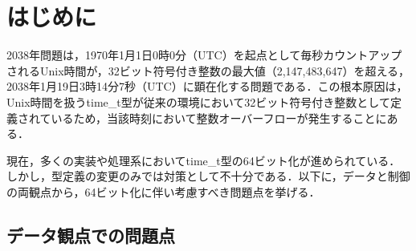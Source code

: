 \documentclass[submit,techrep,noauthor]{ipsj-lualatex}
\begin{document}


\maketitle

\section{はじめに}

2038年問題は，1970年1月1日0時0分（UTC）を起点として毎秒カウントアップされるUnix時間が，32ビット符号付き整数の最大値（2,147,483,647）を超える，2038年1月19日3時14分7秒（UTC）に顕在化する問題である．この根本原因は，Unix時間\cite{ref1}を扱うtime\_t型\cite{ref2}が従来の環境において32ビット符号付き整数として定義されているため，当該時刻において整数オーバーフローが発生することにある．

現在，多くの実装や処理系においてtime\_t型の64ビット化が進められている．しかし，型定義の変更のみでは対策として不十分である．以下に，データと制御の両観点から，64ビット化に伴い考慮すべき問題点を挙げる．

\subsection{データ観点での問題点}
\end{document}

